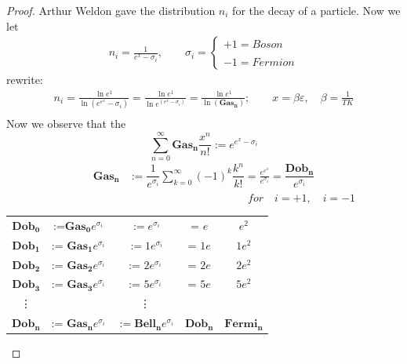 \documentclass[pdflatex,sn-mathphys-num]{sn-jnl}%
\theoremstyle{thmstyleone}%
\theoremstyle{thmstyletwo}%
\theoremstyle{thmstylethree}%
\begin{document}
\begin{proof}
Arthur Weldon \cite{weldon1992thermal} gave the distribution $n_i $ for the decay of a particle. Now we let
\begin{align}
n_i = \frac{1}{e^x - \sigma_i}, \quad \quad
\sigma_i = \begin{cases}
+1 = Boson \\\\
-1 = Fermion
\end{cases}
\end{align}
rewrite:\\
\begin{align*}
 n_i = \frac{\ln e^1}{\ln(e^{e^x}- \sigma_i)} =  \frac{\ln e^1}{\ln e^{(e^x - \sigma_i)}} = \frac{\ln e^1}{\ln (\mathbf{Gas_n})}; \quad \quad  x = \beta \varepsilon,\quad  \beta = \frac{1}{TK}\\
\end{align*}
Now we observe that the $$\sum_{n=0}^{\infty}\mathbf{Gas_n}\dfrac{x^n}{n!}:= e^{e^x - \sigma_i} $$
\begin{align*}
    \mathbf{Gas_n} &:= \dfrac{1}{e^{\sigma_i}}\sum_{k=0}^{\infty}(-1)^k\dfrac{k^n}{k!} = \frac{e^{e^x}}{e^{\sigma_i}} = \dfrac{\mathbf{Dob_n}}{e^{\sigma_i}}
\end{align*}
$\quad \quad \quad \quad \quad \quad \quad \quad \quad \quad \quad \quad \quad \quad \quad \quad \quad \quad \quad \quad \quad \quad for\quad  i = +1, \quad i = -1$\\
\begin{center}
\begin{tabular}{ c c c c c}
$\mathbf{Dob_0}$ &:=$ \mathbf{Gas_0} e^{\sigma_i}$ & $:= e^{\sigma_i}$ & = $e$ & $e^2$\\  
$\mathbf{Dob_1}$ &:= $\mathbf{Gas_1}e^{\sigma_i}$ & $:= 1e^{\sigma_i}$ & = $1e$ & $1e^2$\\ 
$\mathbf{Dob_2}$ &:= $\mathbf{Gas_2} e^{\sigma_i}$ & := $2e^{\sigma_i}$ & = $2e$ & $2e^2$\\ 
$\mathbf{Dob_3}$ & := $\mathbf{Gas_3} e^{\sigma_i}$ & := $5e^{\sigma_i}$ & = $5e$ & $5e^2$\\
\vdots &&\vdots&&\\
$\mathbf{Dob_n} $&:= $\mathbf{Gas_n} e^{\sigma_i}$ & $:= \mathbf{Bell_n}e^{\sigma_i}$ & $\mathbf{Dob_n}$ & $\mathbf{Fermi_n}$\\ 
\end{tabular}
\end{center}
\end{proof}
\end{document}
